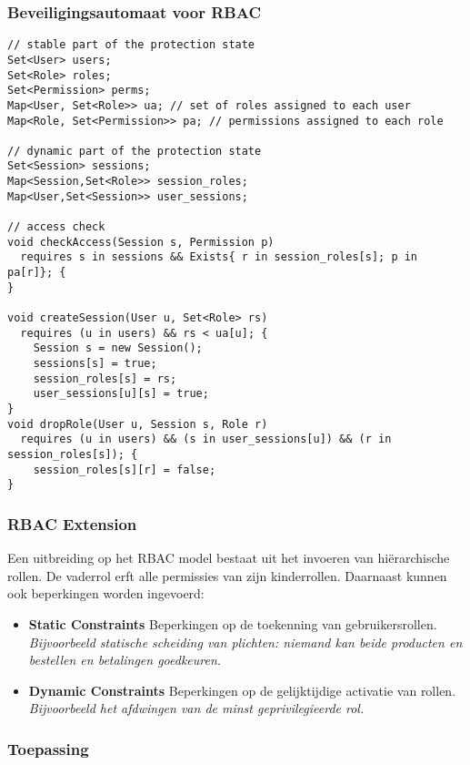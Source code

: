 \documentclass[../main.tex]{subfiles}
\begin{document}
\subsubsection{Beveiligingsautomaat voor RBAC}
\begin{lstlisting}
// stable part of the protection state
Set<User> users;
Set<Role> roles;
Set<Permission> perms;
Map<User, Set<Role>> ua; // set of roles assigned to each user
Map<Role, Set<Permission>> pa; // permissions assigned to each role

// dynamic part of the protection state
Set<Session> sessions;
Map<Session,Set<Role>> session_roles;
Map<User,Set<Session>> user_sessions;

// access check
void checkAccess(Session s, Permission p)
  requires s in sessions && Exists{ r in session_roles[s]; p in pa[r]}; {
}

void createSession(User u, Set<Role> rs)
  requires (u in users) && rs < ua[u]; {
    Session s = new Session();
    sessions[s] = true;
    session_roles[s] = rs;
    user_sessions[u][s] = true;
}
void dropRole(User u, Session s, Role r)
  requires (u in users) && (s in user_sessions[u]) && (r in session_roles[s]); {
    session_roles[s][r] = false;
}
\end{lstlisting}

\subsubsection{RBAC Extension}
Een uitbreiding op het RBAC model bestaat uit het invoeren van hi\"erarchische rollen. De vaderrol erft alle permissies van zijn kinderrollen. Daarnaast kunnen ook beperkingen worden ingevoerd:
\begin{itemize}
	\item \textbf{Static Constraints} Beperkingen op de toekenning van gebruikersrollen. 
	\\ \textit{Bijvoorbeeld statische scheiding van plichten: niemand kan beide producten en bestellen en betalingen goedkeuren.}
	\item \textbf{Dynamic Constraints} Beperkingen op de gelijktijdige activatie van rollen. 
	\\ \textit{Bijvoorbeeld het afdwingen van de minst geprivilegieerde rol.}

\end{itemize}

\subsubsection{Toepassing}
\end{document}
